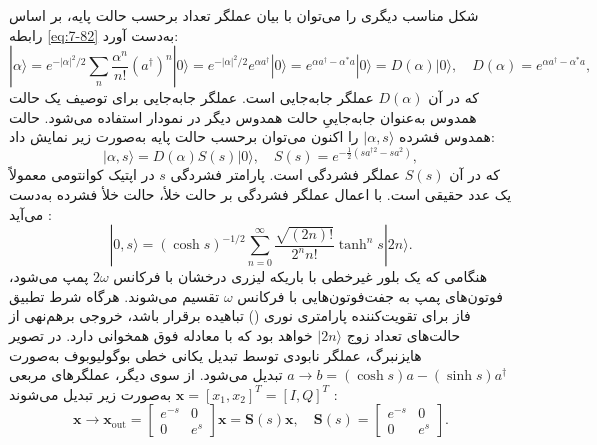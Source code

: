 شکل مناسب دیگری را می‌توان با بیان عملگر تعداد برحسب حالت پایه، بر اساس رابطه \eqref{eq:7-82} به‌دست آورد:
\begin{equation}
	|\alpha\rangle = e^{-|\alpha|^2/2} \sum_n \frac{\alpha^n}{n!} (a^\dagger)^n |0\rangle = e^{-|\alpha|^2/2} e^{\alpha a^\dagger} |0\rangle = e^{\alpha a^\dagger - \alpha^* a} |0\rangle = D(\alpha) |0\rangle, \quad D(\alpha) = e^{\alpha a^\dagger - \alpha^* a},
	\label{eq:7-88}
\end{equation}
که در آن $D(\alpha)$ عملگر جابه‌جایی است. عملگر جابه‌جایی برای توصیف یک حالت همدوس به‌عنوان جابه‌جاییِ حالت همدوس دیگر در نمودار  استفاده می‌شود.
حالت همدوس فشرده $|\alpha, s\rangle$ را اکنون می‌توان برحسب حالت پایه به‌صورت زیر نمایش داد:
\begin{equation}
	|\alpha, s\rangle = D(\alpha) S(s) |0\rangle, \quad S(s) = e^{-\frac{1}{2}(s a^{\dagger 2} - s a^2)},
	\label{eq:7-89}
\end{equation}
که در آن $S(s)$ عملگر فشردگی است. پارامتر فشردگی $s$ در اپتیک کوانتومی معمولاً یک عدد حقیقی است. با اعمال عملگر فشردگی بر حالت خلأ، حالت خلأ فشرده به‌دست می‌آید \cite{7-80, 7-82}:
\begin{equation}
	|0, s\rangle = (\cosh s)^{-1/2} \sum_{n=0}^{\infty} \frac{\sqrt{(2n)!}}{2^n n!} \tanh^n s |2n\rangle.
	\label{eq:7-90}
\end{equation}
هنگامی که یک بلور غیرخطی با باریکه لیزری درخشان با فرکانس $2\omega$ پمپ می‌شود، فوتون‌های پمپ به جفت‌فوتون‌هایی با فرکانس $\omega$ تقسیم می‌شوند. هرگاه شرط تطبیق فاز برای تقویت‌کننده پارامتری نوری () تباهیده برقرار باشد، خروجی برهم‌نهی از حالت‌های تعداد زوج $|2n\rangle$ خواهد بود \cite{7-78, 7-79, 7-80} که با معادله فوق همخوانی دارد. در تصویر هایزنبرگ، عملگر نابودی توسط تبدیل یکانی خطی بوگولیوبوف به‌صورت $a \to b = (\cosh s)a - (\sinh s)a^\dagger$ تبدیل می‌شود. از سوی دیگر، عملگرهای مربعی $\bm{x} = [x_1, x_2]^T = [I, Q]^T$ به‌صورت زیر تبدیل می‌شوند \cite{7-80}:
\begin{equation}
	\bm{x} \to \bm{x}_{\text{out}} = \begin{bmatrix} e^{-s} & 0 \\ 0 & e^s \end{bmatrix} \bm{x} = \bm{S}(s) \bm{x}, \quad \bm{S}(s) = \begin{bmatrix} e^{-s} & 0 \\ 0 & e^s \end{bmatrix}.
	\label{eq:7-91}
\end{equation}
